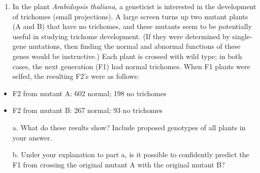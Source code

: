 \documentclass[11pt,]{article}
\providecommand{\tightlist}{%
  \setlength{\itemsep}{0pt}\setlength{\parskip}{0pt}}
\begin{document}
\begin{blackbox}

\begin{enumerate}
\def\labelenumi{\arabic{enumi}.}
\setcounter{enumi}{39}
\tightlist
\item
  In the plant \emph{Arabidopsis thaliana}, a geneticist is interested
  in the development of trichomes (small projections). A large screen
  turns up two mutant plants (A and B) that have no trichomes, and these
  mutants seem to be potentially useful in studying trichome
  development. (If they were determined by single-gene mutations, then
  finding the normal and abnormal functions of these genes would be
  instructive.) Each plant is crossed with wild type; in both cases, the
  next generation (F1) had normal trichomes. When F1 plants were selfed,
  the resulting F2's were as follows:
\end{enumerate}

\vspace{8mm}

\begin{itemize}
\tightlist
\item
  F2 from mutant A: 602 normal; 198 no trichomes
\item
  F2 from mutant B: 267 normal; 93 no trichomes
\end{itemize}

\vspace{8mm}

\begin{enumerate} 
 \item[a.]{ What do these results show? Include proposed genotypes of all plants in your answer. } 
 \item[b.]{ Under your explanation to part a, is it possible to confidently predict the F1 from crossing the original mutant A with the original mutant B?  } 
 \end{enumerate}

\vspace{16cm}

\end{blackbox}
\end{document}
